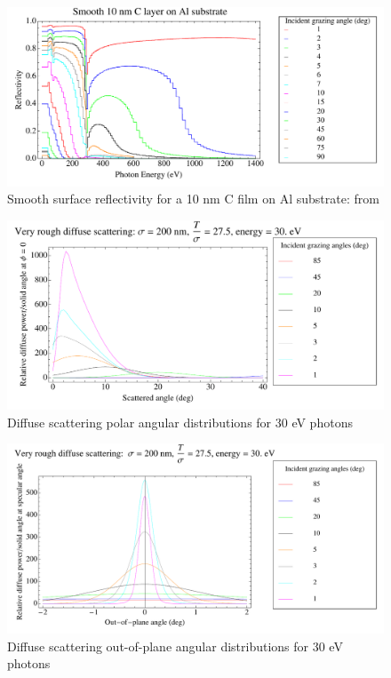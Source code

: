 \documentclass[11pt]{article}
\begin{document}
    \begin{figure}
  \centering
  \includegraphics[width=6in]{Smooth-surface-reflectivity}
   \caption[Smooth surface reflectivity for a 10 nm C film on Al substrate]
   {\label{f:Smooth.surface.reflectivity}
   Smooth surface reflectivity for a 10 nm C film on Al substrate: from \cite{b:henke}}
   \end{figure}
      \begin{figure}
  \centering
 \includegraphics[width=6in]{Diffuse-polar-30ev}
   \caption{   \label{f:Diffuse.polar.30ev}
   Diffuse scattering polar angular distributions for 30 eV photons}
   \end{figure}
      \begin{figure}
  \centering
  \includegraphics[width=6in]{Diffuse-out-of-plane-30ev}
   \caption{   \label{f:Diffuse.out.of.plane.30ev}
   Diffuse scattering out-of-plane angular distributions for 30 eV photons}
   \end{figure}
\end{document}
